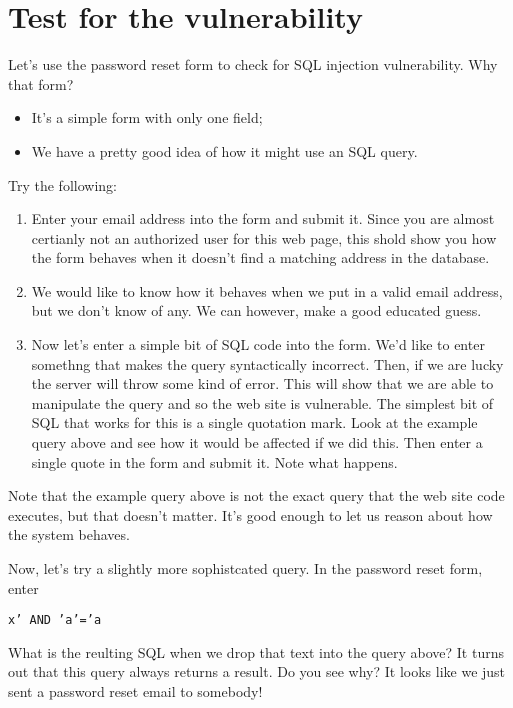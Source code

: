 \documentclass{article}
\begin{document}
\section{Test for the vulnerability}
Let's use the password reset form to check for SQL injection vulnerability. Why that form?

\begin{itemize}
	\item It's a simple form with only one field;
	\item We have a pretty good idea of how it might use an SQL query.
	
\end{itemize}

Try the following:
\begin{enumerate}
	\item Enter your email address into the form and submit it. Since you are almost certianly not an authorized user for this web page, this shold show you how the form behaves when it doesn't find a matching address in the database.
	\item We would like to know how it behaves when we put in a valid email address, but we don't know of any. We can however, make a good educated guess.
	\item Now let's enter a simple bit of SQL code into the form. We'd like to enter somethng that makes the query syntactically incorrect. Then, if we are lucky the server will throw some kind of error.  This will show that we are able to manipulate the query and so the web site is vulnerable. The simplest bit of SQL that works for this is a single quotation mark. Look at the example query above and see how it would be affected if we did this. Then enter a single quote in the form and submit it.  Note what happens.
\end{enumerate}



Note that the example query above is not the exact query that the web site code executes, but that doesn't matter.  It's good enough to let us reason about how the system behaves.

Now, let's try a slightly more sophistcated query.  In the password reset form, enter 

\texttt{x' AND 'a'='a}

What is the reulting SQL when we drop that text into the query above? It turns out that this query always returns a result. Do you see why? It looks like we just sent a password reset email to somebody!
\end{document}

